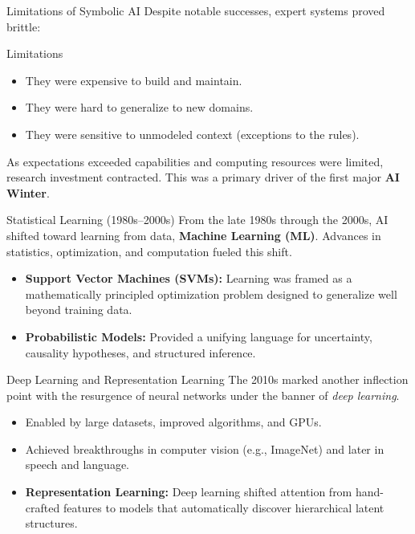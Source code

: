 \documentclass[german,10pt]{beamer}
\begin{document}
\begin{frame}{Limitations of Symbolic AI}
    \justifying
    Despite notable successes, expert systems proved brittle:
    \begin{warningbox}{Limitations}
    \begin{itemize}
        \item They were expensive to build and maintain.
        \item They were hard to generalize to new domains.
        \item They were sensitive to unmodeled context (exceptions to the rules).
    \end{itemize}
    \end{warningbox}
    \vspace{1em}
    As expectations exceeded capabilities and computing resources were limited, research investment contracted. This was a primary driver of the first major \textbf{AI Winter}.
\end{frame}

\begin{frame}{Statistical Learning (1980s--2000s)}
    \justifying
    From the late 1980s through the 2000s, AI shifted toward learning from data, \textbf{Machine Learning (ML)}. Advances in statistics, optimization, and computation fueled this shift.
         \begin{itemize}
        \item \textbf{Support Vector Machines (SVMs):} Learning was framed as a mathematically principled optimization problem designed to generalize well beyond training data. 
        \item \textbf{Probabilistic Models:} Provided a unifying language for uncertainty, causality hypotheses, and structured inference.
          \end{itemize}

\end{frame}

\begin{frame}{Deep Learning and Representation Learning}
    \justifying
    The 2010s marked another inflection point with the resurgence of neural networks under the banner of \emph{deep learning}.
    \begin{itemize}
        \item Enabled by large datasets, improved algorithms, and GPUs.
        \item Achieved breakthroughs in computer vision (e.g., ImageNet) and later in speech and language.
        \item \textbf{Representation Learning:} Deep learning shifted attention from hand-crafted features to models that automatically discover hierarchical latent structures.
    \end{itemize}
\end{frame}
\end{document}
